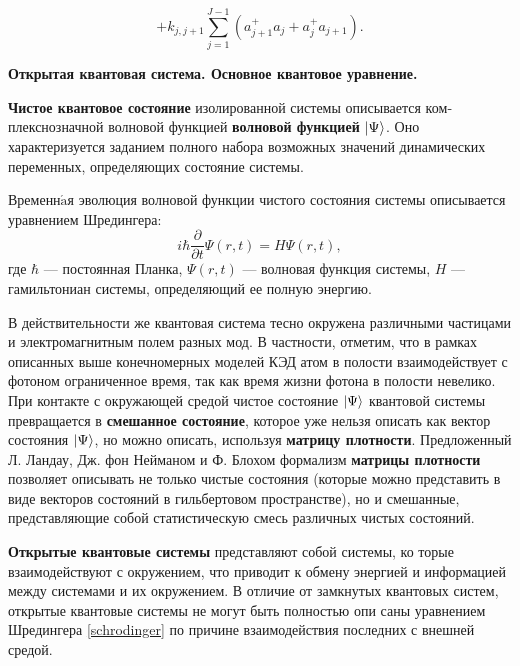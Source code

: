 \begin{equation}
	+k_{j,j+1}\sum_{j=1}^{J-1}{\left(a_{j+1}^+a_j+a_{j}^+a_{j+1}\right)}.
\end{equation}

\clearpage
\indent\textbf{Открытая квантовая система. Основное квантовое уравнение.}

\textbf{Чистое квантовое состояние} изолированной системы описывается ком­плекснозначной волновой функцией \textbf{волновой функцией} $|\Psi\rangle$. Оно характеризуется заданием полного набора возможных значений динамических переменных, определяющих состояние системы.

Временн$\acute{\text{a}}$я эволюция волновой функции чистого состояния системы описывается уравнением Шредингера:
\begin{equation}\label{schrodinger}
	i\hbar\frac{\partial}{\partial t}\Psi(r,t) = H\Psi(r,t),
\end{equation}
где $\hbar$ --- постоянная Планка, $\Psi(r,t)$ --- волновая функция системы, $H$ --- гамильтониан системы, определяющий ее полную энергию.

В действительности же квантовая система тесно окружена различными частицами и электромагнитным полем разных мод. В частности, отметим, что в рамках описанных выше конечномерных моделей КЭД атом в полости взаимодействует с фотоном ограниченное время, так как время жизни фотона в полости невелико. При контакте с окружающей средой чистое состояние $|\Psi\rangle$ квантовой системы превращается в \textbf{смешанное состояние}, которое уже нельзя описать как вектор состояния $ |\Psi\rangle$, но можно описать, используя \textbf{матрицу плотности}. Предложенный Л. Ландау, Дж. фон Нейманом и Ф. Блохом формализм \textbf{матрицы плотности} \cite{landau,belousov,messia} позволяет описывать не только чистые состояния (которые можно представить в виде векторов состояний в гильбертовом пространстве), но и смешанные, представляющие собой статистическую смесь различных чистых состояний.

\textbf{Открытые квантовые системы} \cite{breuer} представляют собой системы, ко­ торые взаимодействуют с окружением, что приводит к обмену энергией и информацией между системами и их окружением. В отличие от замкнутых квантовых систем, открытые квантовые системы не могут быть полностью опи­ саны уравнением Шредингера \eqref{schrodinger} по причине взаимодействия последних с внешней средой.

